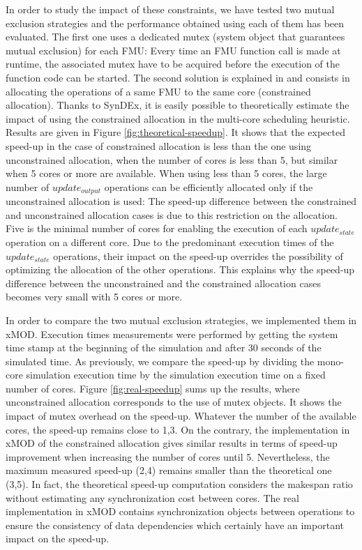 In order to study the impact of these constraints, we have tested two mutual exclusion strategies and the performance obtained using each of them has been evaluated. The first one uses a dedicated mutex (system object that guarantees mutual exclusion) for each FMU: Every time an FMU function call is made at runtime, the associated mutex have to be acquired before the execution of the function code can be started. The second solution is explained in \cite{BenKhaled201479} and consists in allocating the operations of a same FMU to the same core (constrained allocation). Thanks to SynDEx, it is easily possible to theoretically estimate the impact of using the constrained allocation in the multi-core scheduling heuristic. Results are given in Figure \ref{fig:theoretical-speedup}. It shows that the expected speed-up in the case of constrained allocation is less than the one using unconstrained allocation, when the number of cores is less than 5, but similar when 5 cores or more are available. When using less than 5 cores, the large number of $update_{output}$ operations can be efficiently allocated only if the unconstrained allocation is used: The speed-up difference between the constrained and unconstrained allocation cases is due to this restriction on the allocation. Five is the minimal number of cores for enabling the execution of each $update_{state}$ operation on a different core. Due to the predominant execution times of the $update_{state}$ operations, their impact on the speed-up overrides the possibility of optimizing the allocation of the other operations. This explains why the speed-up difference between the unconstrained and the constrained allocation cases becomes very small with 5 cores or more.

In order to compare the two mutual exclusion strategies, we implemented them in xMOD. Execution times measurements were performed by getting the system time stamp at the beginning of the simulation and after 30 seconds of the simulated time. As previously, we compare the speed-up by dividing the mono-core simulation execution time by the simulation execution time on a fixed number of cores. Figure \ref{fig:real-speedup} sums up the results, where unconstrained allocation corresponds to the use of mutex objects. It shows the impact of mutex overhead on the speed-up. Whatever the number of the available cores, the speed-up remains close to 1,3. On the contrary, the implementation in xMOD of the constrained allocation gives similar results in terms of speed-up improvement when increasing the number of cores until 5. Nevertheless, the maximum measured speed-up (2,4) remains smaller than the theoretical one (3,5). In fact, the theoretical speed-up computation considers the makespan ratio without estimating any synchronization cost between cores. The real implementation in xMOD contains synchronization objects between operations to ensure the consistency of data dependencies which certainly have an important impact on the speed-up. 

